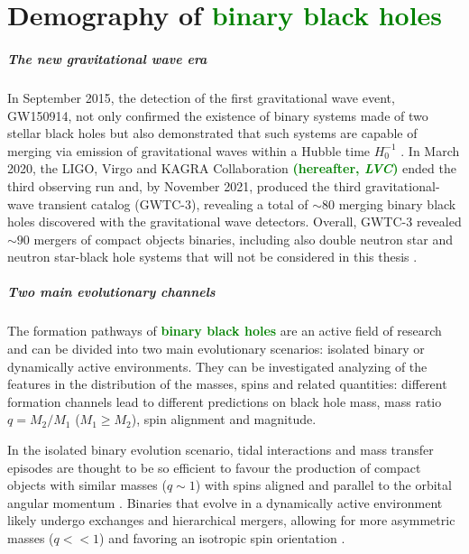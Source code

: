 \documentclass[a4paper,titlepage]{book}     	%
\newcommand{\erika}[1]{\textcolor{green}{\bf#1}}
\begin{document}
\chapter{Demography of \erika{binary black holes}}

\paragraph{The new gravitational wave era} In September 2015, the detection of the first gravitational wave event, GW150914, not only confirmed the existence of binary systems made of two stellar black holes but also demonstrated that such systems are capable of merging via emission of gravitational waves within a Hubble time $H_0^{-1}$ \cite{Abbott2016firstGW}. In March 2020, the LIGO, Virgo and KAGRA Collaboration \erika{(hereafter, \emph{LVC})} ended the third observing run and, by November 2021, produced the third gravitational-wave transient catalog (GWTC-3), revealing a total of $\sim 80$ merging binary black holes discovered with the gravitational wave detectors. Overall, GWTC-3 revealed $\sim 90$ mergers of compact objects binaries, including also double neutron star and neutron star-black hole systems that will not be considered in this thesis \cite{GWTC-3}. 


\paragraph{Two main evolutionary channels}
The formation pathways of \erika{binary black holes} are an active field of research and can be divided into two main evolutionary scenarios: isolated binary or dynamically active environments. They can be investigated analyzing of the features in the distribution of the masses, spins and related quantities: different formation channels lead to different predictions on black hole mass, mass ratio $q=M_2/M_1$ ($M_1 \geq M_2$), spin alignment and magnitude.
 
In the isolated binary evolution scenario, tidal interactions and mass transfer episodes are thought to be so efficient to favour the production of compact objects with similar masses ($q \sim 1$) \cite{giacobbomapelli2018_mobse_fryer} with spins aligned and parallel to the orbital angular momentum \cite{Kalogera2000_spinaligned}. Binaries that evolve in a dynamically active environment likely undergo exchanges and hierarchical mergers, allowing for more asymmetric masses ($q << 1$) \cite{Rastello2021_dynamics} and favoring an isotropic spin orientation \cite{Rodriguez2016_BHspins}.
\end{document}
